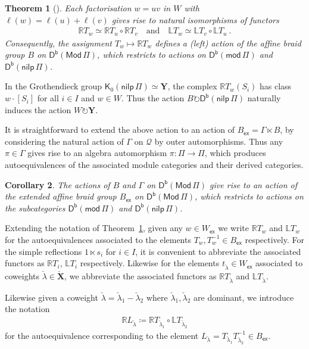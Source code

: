 \documentclass[reqno,a4paper]{amsart}
\newcommand{\LL}{\mathbb{L}}
\newcommand{\R}{\mathbb{R}}
\newcommand{\sfK}{\mathsf{K}}
\newcommand{\bfY}{\mathbf{Y}}
\newcommand{\bfX}{\mathbf{X}}
\newcommand{\catMod}{\mathsf{Mod}}
\newcommand{\catmod}{\mathsf{mod}}
\newcommand{\modPi}{\catmod\, \Pi}
\newcommand{\ModPi}{\catMod\, \Pi}
\newcommand{\nilpPi}{\mathsf{nilp}\, \Pi}
\newcommand{\catDb}{\mathsf{D}^\mathsf{b}}
\newcommand{\qv}{\mathcal{Q}}
\newcommand{\Llambda}{{\check{\lambda}}}
\newcommand{\rootlattice}{\bfY}
\newcommand{\weightlattice}{\bfX}
\newcommand{\coweightlattice}{\check{\weightlattice}}
\newcommand{\sfex}{\mathsf{ex}}
\theoremstyle{basic-theorem}
\newtheorem{theorem}{Theorem}[section]
\newtheorem{corollary}[theorem]{Corollary}
\numberwithin{equation}{section}
\begin{document}
\begin{theorem}[{{\cite[Proposition~2.27]{SY13}\cite[Theorem~6.6-(2)]{IR08}}}]\label{thm:twist}
    Each factorisation $w=uv$ in $W$ with $\ell(w)=\ell(u)+\ell(v)$ gives rise to natural isomorphisms of functors
	\begin{align}
		\R T_w \simeq \R T_u \circ \R T_v \quad \text{and}\quad \LL T_w \simeq \LL T_v \circ \LL T_u\ .
	\end{align}
    Consequently, the assignment $T_w\mapsto \R T_w$ defines a (left) action of the affine braid group $B$ on $\catDb(\ModPi)$, which restricts to actions on $\catDb(\modPi)$ and $\catDb(\nilpPi)$.
\end{theorem}

\begin{remark}
    In the Grothendieck group $\sfK_0(\nilpPi)\simeq \rootlattice$, the complex $\R T_w(S_i)$ has class $w\cdot [S_i]$ for all $i\in I$ and $w\in W$.  Thus the action $B\circlearrowright \catDb(\nilpPi)$ naturally induces the action $W\circlearrowright \rootlattice$.
\end{remark}

It is straightforward to extend the above action to an action of $B_\sfex=\Gamma\ltimes B$, by considering the natural action of $\Gamma$ on $\qv$ by outer automorphisms. Thus any $\pi\in\Gamma$ gives rise to an algebra automorphism $\pi\colon \Pi\to \Pi$, which produces autoequivalences of the associated module categories and their derived categories.

\begin{corollary}\label{cor:twist}
	The actions of $B$ and $\Gamma$ on $\catDb(\ModPi)$ give rise to an action of the extended affine braid group $B_\sfex$ on $\catDb(\ModPi)$, which restricts to actions on the subcategories $\catDb(\modPi)$ and $\catDb (\nilpPi)$.
\end{corollary}

Extending the notation of Theorem~\ref{thm:twist}, given any $w\in W_\sfex$ we write $\R T_w$ and $\LL T_w$ for the autoequivalences associated to the elements $T_w,T_w^{-1}\in B_\sfex$ respectively. For the simple reflections $1\ltimes s_i$ for $i\in I$, it is convenient to abbreviate the associated functors as $\R T_i$, $\LL T_i$ respectively. Likewise for the elements $t_\Llambda\in W_\sfex$ associated to coweights $\Llambda\in \coweightlattice$, we abbreviate the associated functors as $\R T_\Llambda$ and $\LL T_\Llambda$.

Likewise given a coweight $\Llambda=\Llambda_1-\Llambda_2$ where $\Llambda_1,\Llambda_2$ are dominant, we introduce the notation
\begin{align}
	\R L_{\Llambda}\coloneqq\R T_{\Llambda_1}\circ \LL T_{\Llambda_2}
\end{align}
for the autoequivalence corresponding to the element $L_\Llambda=T_{\Llambda_1}T_{\Llambda_2}^{-1}\in B_\sfex$.
\end{document}
